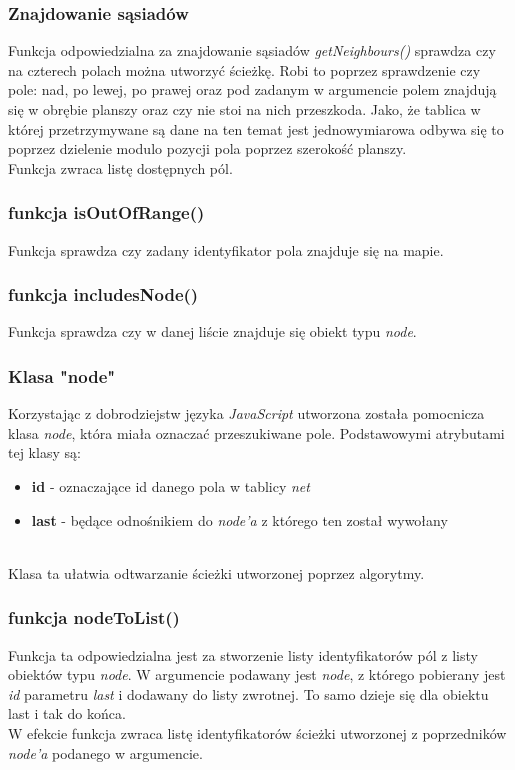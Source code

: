 \documentclass{article}
\begin{document}
\subsubsection{Znajdowanie sąsiadów}
Funkcja odpowiedzialna za znajdowanie sąsiadów \textit{getNeighbours()} sprawdza czy na czterech polach można utworzyć ścieżkę. Robi to poprzez sprawdzenie czy pole: nad, po lewej, po prawej oraz pod zadanym w argumencie polem znajdują się w obrębie planszy oraz czy nie stoi na nich przeszkoda. Jako, że tablica w której przetrzymywane są dane na ten temat jest jednowymiarowa odbywa się to poprzez dzielenie modulo pozycji pola poprzez szerokość planszy.\\
Funkcja zwraca listę dostępnych pól.
\subsubsection{funkcja isOutOfRange()}
Funkcja sprawdza czy zadany identyfikator pola znajduje się na mapie.
\subsubsection{funkcja includesNode()}
Funkcja sprawdza czy w danej liście znajduje się obiekt typu \textit{node}.

\subsubsection{Klasa "node"}
Korzystając z dobrodziejstw języka \textit{JavaScript} utworzona została pomocnicza klasa \textit{node}, która miała oznaczać przeszukiwane pole. Podstawowymi atrybutami tej klasy są:
\begin{itemize}
\item \textbf{id} - oznaczające id danego pola w tablicy \textit{net}
\item \textbf{last} - będące odnośnikiem do \textit{node'a} z którego ten został wywołany
\end{itemize}\\
Klasa ta ułatwia odtwarzanie ścieżki utworzonej poprzez algorytmy.

\subsubsection{funkcja nodeToList()}
Funkcja ta odpowiedzialna jest za stworzenie listy identyfikatorów pól z listy obiektów typu \textit{node}. W argumencie podawany jest \textit{node}, z którego pobierany jest \textit{id} parametru \textit{last} i dodawany do listy zwrotnej. To samo dzieje się dla obiektu last i tak do końca. \\
W efekcie funkcja zwraca listę identyfikatorów ścieżki utworzonej z poprzedników \textit{node'a} podanego w argumencie.
\end{document}
